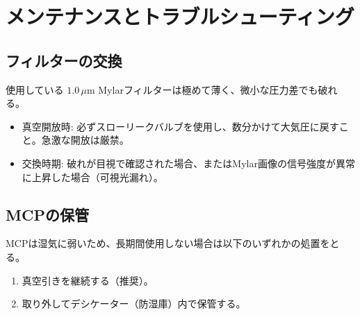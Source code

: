 \section{メンテナンスとトラブルシューティング}

\subsection{フィルターの交換}
使用している $1.0\,\mu\mathrm{m}$ Mylarフィルターは極めて薄く、微小な圧力差でも破れる。
\begin{itemize}
    \item 真空開放時: 必ずスローリークバルブを使用し、数分かけて大気圧に戻すこと。急激な開放は厳禁。
    \item 交換時期: 破れが目視で確認された場合、またはMylar画像の信号強度が異常に上昇した場合（可視光漏れ）。
\end{itemize}

\subsection{MCPの保管}
MCPは湿気に弱いため、長期間使用しない場合は以下のいずれかの処置をとる。
\begin{enumerate}
    \item 真空引きを継続する（推奨）。
    \item 取り外してデシケーター（防湿庫）内で保管する。
\end{enumerate}